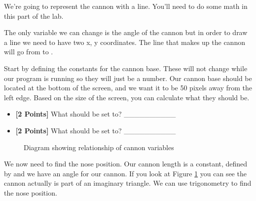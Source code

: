 \documentclass[letterpaper,10pt,english]{sphinxmanual}
\begin{document}
We're going to represent the cannon with a line. You'll need to do some math in this part of the lab.

The only variable we can change is the angle of the cannon but in order to draw a line we need to have two x, y coordinates. The line that makes up the cannon will go from  to .

Start by defining the constants for the cannon base. These will not change while our program is running so they will just be a number. Our cannon base should be located at the bottom of the screen, and we want it to be 50 pixels away from the left edge. Based on the size of the screen, you can calculate what they should be.
\begin{itemize}
\item {} 
\textbf{{[}2 Points{]}} What should  be set to?  \_\_\_\_\_\_\_\_\_\_

\item {} 
\textbf{{[}2 Points{]}} What should  be set to?  \_\_\_\_\_\_\_\_\_\_

\end{itemize}
\begin{figure}[htbp]
\centering
\capstart

\caption{Diagram showing relationship of cannon variables}\label{week_3/index:fig-cannon-drawing}\end{figure}

We now need to find the nose position. Our cannon length is a constant, defined by  and we have an angle for our cannon. If you look at Figure \ref{week_3/index:fig-cannon-drawing} you can see the cannon actually is part of an imaginary triangle. We can use trigonometry to find the nose position.
\end{document}
